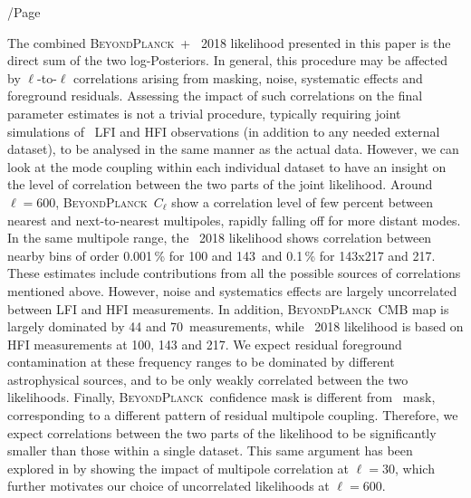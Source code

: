 /Page\documentclass[twocolumn]{aa}
\newcommand{\BP}{\textsc{BeyondPlanck}}
\begin{document}
The combined \BP\ + \Planck\ 2018 likelihood presented in this paper is 
the direct sum of the two log-Posteriors. In general, this procedure 
may be affected by $\ell$-to-$\ell$ correlations arising from masking, 
noise, systematic effects and foreground residuals. Assessing the 
impact of such correlations on the final parameter estimates is not 
a trivial procedure, typically requiring joint simulations of \Planck\ 
LFI and HFI observations (in addition to any needed external dataset), 
to be analysed in the same manner as the actual data.
However, we can look at the mode coupling within each individual dataset 
to have an insight on the level of correlation between the two parts of 
the joint likelihood. Around $\ell = 600$, \BP\ $C_\ell$ show a 
correlation level of few percent between nearest and next-to-nearest 
multipoles, rapidly falling off for more distant modes. In the same 
multipole range, the \Planck\ 2018 likelihood shows correlation between 
nearby bins of order 0.001\,\% for 100 and 143\GHz\ and 0.1\,\% for 143x217 and 
217\GHz. These estimates include contributions from all the possible 
sources of correlations mentioned above. However, noise and systematics 
effects are largely uncorrelated between LFI and HFI measurements. 
In addition, \BP\ CMB map is largely dominated by 44 and 70\GHz\ 
measurements, while \Planck\ 2018 likelihood is based on HFI measurements 
at 100, 143 and 217\GHz. We expect residual foreground contamination at 
these frequency ranges to be dominated by different astrophysical sources, 
and to be only weakly correlated between the two likelihoods. Finally, 
\BP\ confidence mask is different from \Planck\ mask, corresponding to 
a different pattern of residual multipole coupling. Therefore, we expect 
correlations between the two parts of the likelihood to be significantly 
smaller than those within a single dataset. This same argument has been
explored in \citet{Gjerlow_2013} by showing the impact of multipole 
correlation at $\ell=30$, which further motivates our choice of uncorrelated
likelihoods at $\ell=600$.  
\end{document}
